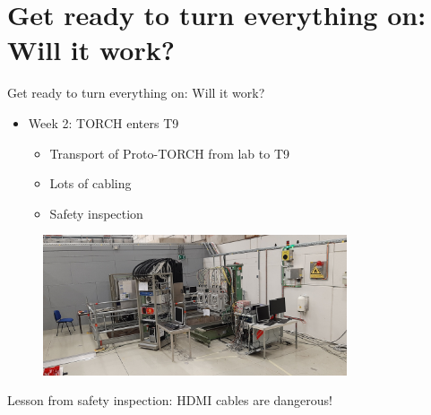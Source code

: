 \documentclass[xcolor = table]{beamer}
\begin{document}
\section{Get ready to turn everything on: Will it work?}
\begin{frame}{Get ready to turn everything on: Will it work?}
  \begin{itemize}
    \item{Week 2: TORCH enters T9}
    \begin{itemize}
      \item{Transport of Proto-TORCH from lab to T9}
      \item{Lots of cabling}
      \item{Safety inspection}
    \end{itemize}
  \end{itemize}
  \begin{figure}
    \centering
    \includegraphics[width = 0.8\textwidth]{Plots/TelescopeTORCHoverview.jpg}
  \end{figure}
  \begin{center}
    \large Lesson from safety inspection: HDMI cables are dangerous!
  \end{center}
\end{frame}
\end{document}
